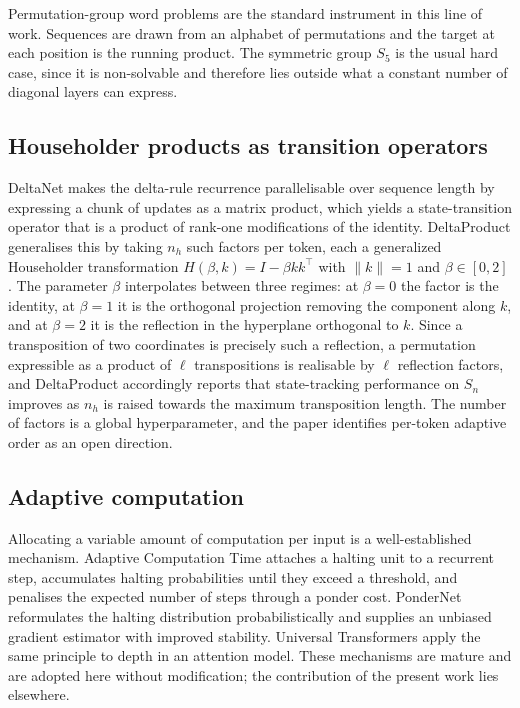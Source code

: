 Permutation-group word problems are the standard instrument in this line of work.
Sequences are drawn from an alphabet of permutations and the target at each
position is the running product. The symmetric group $S_5$ is the usual hard
case, since it is non-solvable and therefore lies outside what a constant number
of diagonal layers can express.

\subsection{Householder products as transition operators}

DeltaNet \cite{deltanet} makes the delta-rule recurrence parallelisable over
sequence length by expressing a chunk of updates as a matrix product, which
yields a state-transition operator that is a product of rank-one modifications of
the identity. DeltaProduct \cite{deltaproduct} generalises this by taking $n_h$
such factors per token, each a generalized Householder transformation
$H(\beta,k) = I - \beta k k^{\!\top}$ with $\lVert k \rVert = 1$ and
$\beta \in [0,2]$. The parameter $\beta$ interpolates between three regimes: at
$\beta = 0$ the factor is the identity, at $\beta = 1$ it is the orthogonal
projection removing the component along $k$, and at $\beta = 2$ it is the
reflection in the hyperplane orthogonal to $k$. Since a transposition of two
coordinates is precisely such a reflection, a permutation expressible as a
product of $\ell$ transpositions is realisable by $\ell$ reflection factors, and
DeltaProduct accordingly reports that state-tracking performance on $S_n$
improves as $n_h$ is raised towards the maximum transposition length. The number
of factors is a global hyperparameter, and the paper identifies per-token
adaptive order as an open direction.

\subsection{Adaptive computation}

Allocating a variable amount of computation per input is a well-established
mechanism. Adaptive Computation Time \cite{act} attaches a halting unit to a
recurrent step, accumulates halting probabilities until they exceed a threshold,
and penalises the expected number of steps through a ponder cost. PonderNet
\cite{pondernet} reformulates the halting distribution probabilistically and
supplies an unbiased gradient estimator with improved stability. Universal
Transformers \cite{universaltransformer} apply the same principle to depth in an
attention model. These mechanisms are mature and are adopted here without
modification; the contribution of the present work lies elsewhere.

